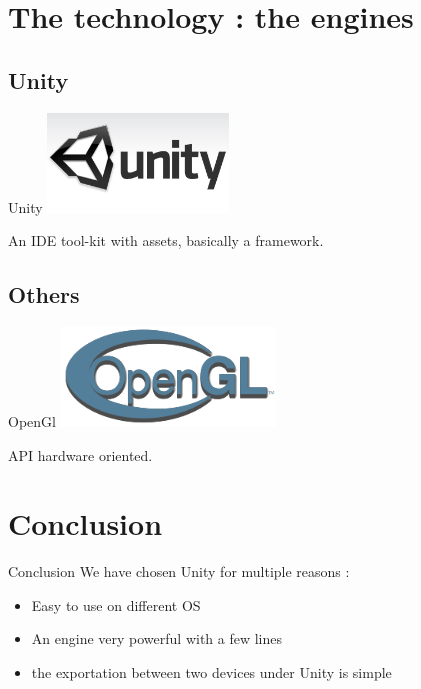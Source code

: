 \documentclass[a4paper,10pt]{beamer}
\begin{document}
	\section{The technology : the engines}
	
		\subsection{Unity}
		
			\begin{frame}{Unity}
				\includegraphics[height=75pt]{images/Logo_Unity.jpg}
				
				 An IDE tool-kit with assets, basically a framework. 
			\end{frame}
			
		\subsection{Others}
			
			\begin{frame}{OpenGl}
				\includegraphics[height=75pt]{images/OpenGL_logo.png}
				
				API hardware oriented.
			\end{frame}
			
	\section{Conclusion}
		
		\begin{frame}{Conclusion}
			We have chosen Unity for multiple reasons :
			\begin{itemize}
				\item Easy to use on different OS
				\item An engine very powerful with a few lines
				\item the exportation between two devices under Unity is simple
			\end{itemize}			
		\end{frame}
	
\end{document}
